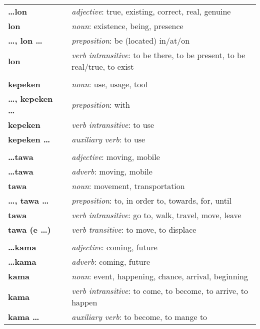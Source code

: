\begin{supertabular}{p{2,5cm}|ll}
\textbf{\dots lon} && \textit{adjective}: true, existing, correct, real, genuine \\ %
\textbf{lon} && \textit{noun}: existence, being, presence \\ %
\textbf{\dots , lon \dots} && \textit{preposition}: be (located) in/at/on \\ %
\textbf{lon} && \textit{verb intransitive}: to be there, to be present, to be real/true, to exist \\ %
 && \\ %
\textbf{kepeken} && \textit{noun}: use, usage, tool \\ %
\textbf{\dots , kepeken \dots} && \textit{preposition}: with \\ %
\textbf{kepeken} && \textit{verb intransitive}: to use \\ %
\textbf{kepeken \dots} && \textit{auxiliary verb}: to use \\ %
 && \\ %
\textbf{\dots tawa} && \textit{adjective}: moving, mobile \\ %
\textbf{\dots tawa} && \textit{adverb}: moving, mobile \\ %
\textbf{tawa} && \textit{noun}: movement, transportation \\ %
\textbf{\dots , tawa \dots} && \textit{preposition}: to, in order to, towards, for, until \\ %
\textbf{tawa} && \textit{verb intransitive}: go to, walk, travel, move, leave \\ %
\textbf{tawa (e \dots)} && \textit{verb transitive}: to move, to displace \\ %
 && \\ %
\textbf{\dots kama} && \textit{adjective}: coming, future \\ %
\textbf{\dots kama} && \textit{adverb}: coming, future \\ %
\textbf{kama} && \textit{noun}: event, happening, chance, arrival, beginning \\ %
\textbf{kama} && \textit{verb intransitive}: to come, to become, to arrive, to happen \\ %
\textbf{kama \dots} && \textit{auxiliary verb}: to become, to mange to \\ %

\end{supertabular}
